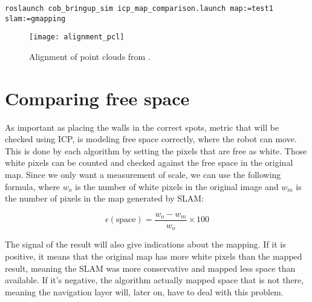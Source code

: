 \begin{verbatim}
roslaunch cob_bringup_sim icp_map_comparison.launch map:=test1 slam:=gmapping
\end{verbatim}

\begin{figure}[!ht]
    \centering
    \texttt{[image: alignment\_pcl]}
    \caption{Alignment of point clouds from .}
    \label{fig:alignment_pcl}
\end{figure}

\section{Comparing free space} \label{sec:free_space}

As important as placing the walls in the correct spots, metric that will be checked using ICP, is modeling free space correctly, where the robot can move. This is done by each algorithm by setting the pixels that are free as white. Those white pixels can be counted and checked against the free space in the original map. Since we only want a measurement of scale, we can use the following formula, where $w_o$ is the number of white pixels in the original image and $w_m$ is the number of pixels in the map generated by SLAM:

\begin{equation}
\epsilon(\text{space}) = \frac{w_o - w_m}{w_o} \times 100
\end{equation}

The signal of the result will also give indications about the mapping. If it is positive, it means that the original map has more white pixels than the mapped result, meaning the SLAM was more conservative and mapped less space than available. If it's negative, the algorithm actually mapped space that is not there, meaning the navigation layer will, later on, have to deal with this problem.